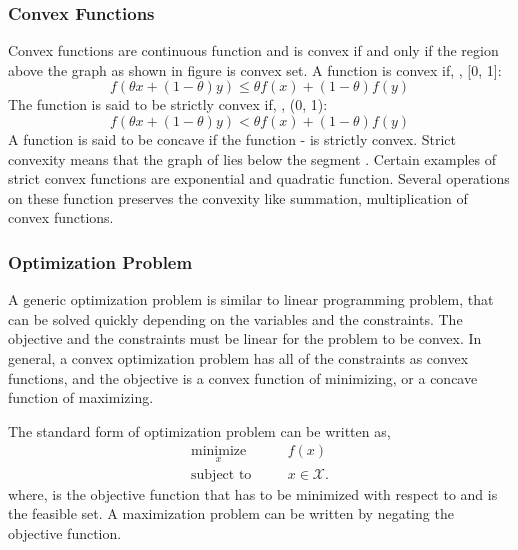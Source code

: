 \subsubsection{Convex Functions}

Convex functions are continuous function and is convex if and only if the region above the graph as shown in figure is convex set. A function  is convex if, \me{\forall}  \me{\in} , \me{ \forall} \me{ \theta \in} [0, 1]: 
\begin{equation}
f(\theta x + (1 - \theta) y) \leq \theta f(x) + (1 - \theta) f(y)
\end{equation}
The function  is said to be strictly convex if, \me{ \forall}  \me{\in} , \me{ \forall} \me{ \theta \in} (0, 1):
\begin{equation}
f(\theta x + (1 - \theta) y) < \theta f(x) + (1 - \theta) f(y)
\end{equation}
A function  is said to be concave if the function - is strictly convex. Strict convexity means that the graph of  lies below the segment . Certain examples of strict convex functions are exponential and quadratic function. Several operations on these function preserves the convexity like summation, multiplication of convex functions. 

\subsubsection{Optimization Problem}

A generic optimization problem is similar to linear programming problem, that can be solved quickly depending on the variables and the constraints. The objective and the constraints must be linear for the problem to be convex. In general, a convex optimization problem has all of the constraints as convex functions, and the objective is a convex function of minimizing, or a concave function of maximizing. 

The standard form of optimization problem can be written as,
\begin{eqnarray}
\underset{x}{\text{minimize}} \quad && f(x) \\
\text{subject to} \quad && x \in \mathcal{X}. 
\end{eqnarray}
where,  is the objective function that has to be minimized with respect to  and  \me{\subset}  is the feasible set. A maximization problem can be written by negating the objective function.

